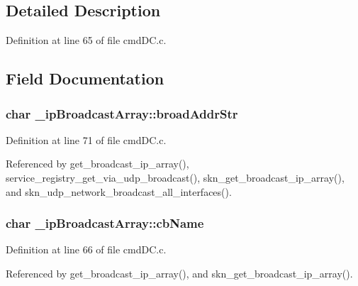 \subsection{Detailed Description}


Definition at line 65 of file cmd\+D\+C.\+c.



\subsection{Field Documentation}
\subsubsection[{\texorpdfstring{broad\+Addr\+Str}{broadAddrStr}}]{\setlength{\rightskip}{0pt plus 5cm}char \+\_\+ip\+Broadcast\+Array\+::broad\+Addr\+Str}\hypertarget{struct__ip_broadcast_array_af40943e174ba847fa0218cfa6051e277}{}\label{struct__ip_broadcast_array_af40943e174ba847fa0218cfa6051e277}


Definition at line 71 of file cmd\+D\+C.\+c.



Referenced by get\+\_\+broadcast\+\_\+ip\+\_\+array(), service\+\_\+registry\+\_\+get\+\_\+via\+\_\+udp\+\_\+broadcast(), skn\+\_\+get\+\_\+broadcast\+\_\+ip\+\_\+array(), and skn\+\_\+udp\+\_\+network\+\_\+broadcast\+\_\+all\+\_\+interfaces().

\subsubsection[{\texorpdfstring{cb\+Name}{cbName}}]{\setlength{\rightskip}{0pt plus 5cm}char \+\_\+ip\+Broadcast\+Array\+::cb\+Name}\hypertarget{struct__ip_broadcast_array_a0f592bd31dcc3ce00a349f04ff6bd1ba}{}\label{struct__ip_broadcast_array_a0f592bd31dcc3ce00a349f04ff6bd1ba}


Definition at line 66 of file cmd\+D\+C.\+c.



Referenced by get\+\_\+broadcast\+\_\+ip\+\_\+array(), and skn\+\_\+get\+\_\+broadcast\+\_\+ip\+\_\+array().

